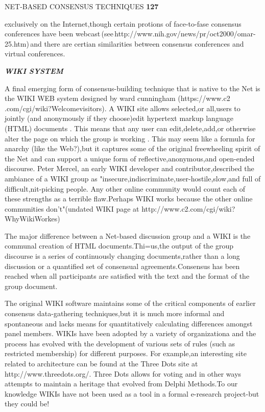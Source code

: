 \documentclass[10pt,a4paper]{book}
\begin{document}
\begin{flushright}
  \textsc{NET-BASED CONSENSUS TECHNIQUES \quad \textbf{127}}
\end{flushright}

exclusively on the Internet,though certain protions of face-to-fase consensus conferences have been webcast\,(see\,http://www.nih.gov/news/pr/oct2000/omar-25.htm)\,and there are certian similarities between consensus conferences and virtual conferences.

\begin{flushleft}
  \textbf{\textsl{WIKI SYSTEM}}
\end{flushleft}

A final emerging form of consensus-building technique that is native to the Net is the WIKI WEB system designed by ward cunningham (https://www.c2 .com/cgi/wiki?Welcomevisitors).\; A WIKI site allows selected,\:or all,\:users to \; jointly (and anonymously if they choose)edit hypertext markup language (HTML) documents . This means that any user can edit,delete,add,or otherwise alter the page on which the group is working . This may seem like a formula for anarchy (like the Web?),but it captures some of the original freewheeling spirit of the Net and can support a unique form of reflective,anonymous,and open-ended discourse. Peter Mercel, an early WIKI developer and contributor,described the ambiance of a WIKI group as "insecure,indiscriminate,user-hostile,slow,and full of difficult,nit-picking people. Any other online community would count each of these strengths as a terrible flaw\;.\;Perhaps WIKI works because the other online communities don't"(undated WIKI page at http://www.c2.com/cgi/wiki?WhyWikiWorkes)

The major difference between a Net-based discussion group and a WIKI is the communal creation of HTML documents.Thi=us,the output of the group discourse is a series of continuously changing documents,rather than a long discussion or a quantified set of consensual agreements.Consensus has been reached when all participants are satisfied with the text and the format of the group document.

The original WIKI software maintains some of the critical components of earlier consensus data-gathering techniques,but it is much more informal and spontaneous and lacks means for quantitatively calculating differences amongst panel members. WIKIs have been adopted by a variety of organizationa and the process has evolved with the development of various sets of rules (such as restricted membership) for different purposes. For example,an interesting site related to architecture can be found at the Three Dots site at http://www.threedots.org/. Three Dots allows for voting and in other ways attempts to maintain a heritage that evolved from Delphi Methods.To our knowledge WIKIs have not been used as a tool in a formal e-research project-but they could be!
\end{document}
